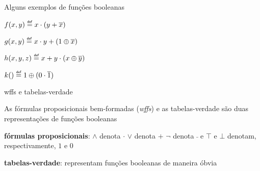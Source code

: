 \expandafter\documentclass\expandafter[table, usenames, svgnames, dvipsnames,14pt, \classopts]{beamer}
\newcommand\defeq{\mathrel{\overset{\makebox[0pt]{\mbox{\normalfont\tiny\sffamily def}}}{=}}}
\begin{document}
\begin{frame}{Alguns exemplos de funções booleanas}

    \begin{outline}[enumerate]
        \1 $f(x,y) \defeq x \cdot (y + \overline{x})$
            
        \vspace{1em}
            
        \1 $g(x,y) \defeq x \cdot y + (1 \oplus \overline{x})$

        \vspace{1em}

        \1 $h(x,y,z) \defeq x + y \cdot (x \oplus \overline{y})$

        \vspace{1em}

        \1 $k() \defeq 1 \oplus (0 \cdot \overline{1})$
    \end{outline}        

\end{frame}

\begin{frame}{wffs e tabelas-verdade}

    As fórmulas proposicionais bem-formadas (\textit{wffs}) e as tabelas-verdade são duas representações de funções booleanas

    \begin{outline}
        \1 \textbf{fórmulas proposicionais}:
            \2[-] $\land$ denota $\cdot$
            \2[-] $\lor$ denota $+$
            \2[-] $\lnot$ denota $\bar{~}$
            \2[-] e $\top$ e $\bot$ denotam, respectivamente, $1$ e $0$
        
        \vspace{1em}
        
        \1 \textbf{tabelas-verdade}: representam funções booleanas de maneira óbvia
    \end{outline}        
            
\end{frame}
\end{document}

